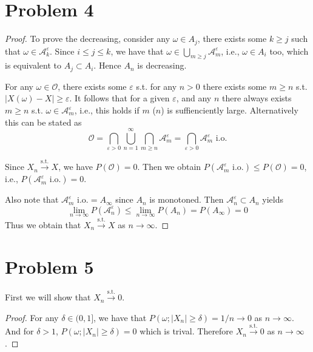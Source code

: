 \documentclass{homework}
\begin{document}
    \section{Problem 4}
    \begin{proof}
        To prove the decreasing, consider any $\omega\in A_j$,
        there exists some $k\geq j$ such that $\omega\in\mathcal A_k^\varepsilon$.
        Since $i\leq j\leq k$, we have that $\omega\in\bigcup_{m\geq j}\mathcal A_m^\varepsilon$,
        i.e., $\omega\in A_i$ too, which is equivalent to $A_j\subset A_i$. Hence
        $A_n$ is decreasing.

        For any $\omega\in\mathcal O$, there exists some $\varepsilon$ s.t.
        for any $n>0$ there exists some $m\geq n$ s.t. $|X(\omega)-X|\geq\varepsilon$.
        It follows that for a given $\varepsilon$, and any $n$ there always
        exists $m\geq n$ s.t. $\omega\in\mathcal A_m^\varepsilon$, i.e.,
        this holds if $m$ ($n$) is suffienciently large.
        Alternatively this can be stated as
        \[\mathcal O=\bigcap_{\varepsilon>0}\bigcup_{n=1}^\infty
        \bigcap_{m\geq n}\mathcal A_m^\varepsilon
        =\bigcap_{\varepsilon>0}\mathcal A_m^\varepsilon\text{ i.o.}\]

        Since $X_n\xrightarrow{\mathrm{s.t.}}X$, we have $P(\mathcal O)=0$.
        Then we obtain $P(\mathcal A_m^\varepsilon\text{ i.o.})\leq
        P(\mathcal{O})=0$, i.e., $P(\mathcal A_m^\varepsilon\text{ i.o.})=0$.
        
        Also note that $\mathcal A_m^\varepsilon\text{ i.o.}=A_\infty$ since
        $A_n$ is monotoned. Then $\mathcal A_n^\varepsilon
        \subset A_n$ yields
        \[\lim_{n\to\infty}P(\mathcal A_n^\varepsilon)
        \leq\lim_{n\to\infty}P(A_n)=P(A_\infty)=0\]
        Thus we obtain that $X_n\xrightarrow{\mathrm{s.t.}}X$ as
        $n\to\infty$.
    \end{proof}

    \section{Problem 5}
    First we will show that $X_n\xrightarrow{\mathrm{s.t.}}0$.
    \begin{proof}
        For any $\delta\in(0,1]$, we have that $P(\omega;|X_n|\geq\delta)
        =1/n\to 0$ as $n\to\infty$. And for $\delta>1$, $P(\omega;|X_n|\geq\delta)
        =0$ which is trival. Therefore $X_n\xrightarrow{\mathrm{s.t.}}0$ as
        $n\to\infty$.
    \end{proof}
\end{document}
